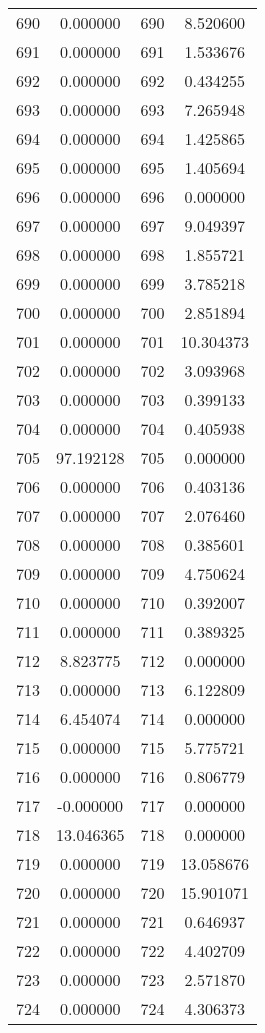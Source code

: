 \documentclass[12pt]{article}
\begin{document}
\begin{longtable}{@{}cccc@{}}
690 & 0.000000 & 690 & 8.520600 \\
691 & 0.000000 & 691 & 1.533676 \\
692 & 0.000000 & 692 & 0.434255 \\
693 & 0.000000 & 693 & 7.265948 \\
694 & 0.000000 & 694 & 1.425865 \\
695 & 0.000000 & 695 & 1.405694 \\
696 & 0.000000 & 696 & 0.000000 \\
697 & 0.000000 & 697 & 9.049397 \\
698 & 0.000000 & 698 & 1.855721 \\
699 & 0.000000 & 699 & 3.785218 \\
700 & 0.000000 & 700 & 2.851894 \\
701 & 0.000000 & 701 & 10.304373 \\
702 & 0.000000 & 702 & 3.093968 \\
703 & 0.000000 & 703 & 0.399133 \\
704 & 0.000000 & 704 & 0.405938 \\
705 & 97.192128 & 705 & 0.000000 \\
706 & 0.000000 & 706 & 0.403136 \\
707 & 0.000000 & 707 & 2.076460 \\
708 & 0.000000 & 708 & 0.385601 \\
709 & 0.000000 & 709 & 4.750624 \\
710 & 0.000000 & 710 & 0.392007 \\
711 & 0.000000 & 711 & 0.389325 \\
712 & 8.823775 & 712 & 0.000000 \\
713 & 0.000000 & 713 & 6.122809 \\
714 & 6.454074 & 714 & 0.000000 \\
715 & 0.000000 & 715 & 5.775721 \\
716 & 0.000000 & 716 & 0.806779 \\
717 & -0.000000 & 717 & 0.000000 \\
718 & 13.046365 & 718 & 0.000000 \\
719 & 0.000000 & 719 & 13.058676 \\
720 & 0.000000 & 720 & 15.901071 \\
721 & 0.000000 & 721 & 0.646937 \\
722 & 0.000000 & 722 & 4.402709 \\
723 & 0.000000 & 723 & 2.571870 \\
724 & 0.000000 & 724 & 4.306373 \\

\end{longtable}
\end{document}
